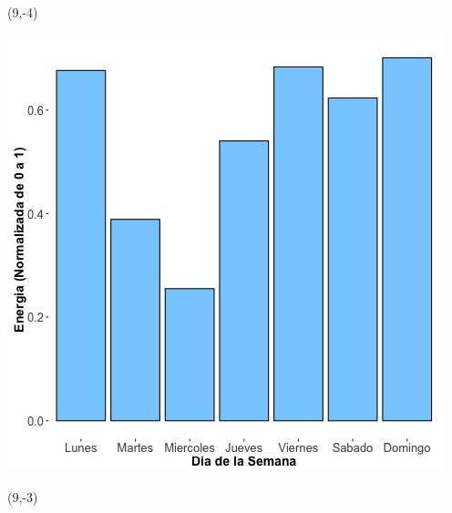 \documentclass{article}\usepackage[]{graphicx}\usepackage[]{color}
\newenvironment{knitrout}{}{} %
\begin{document}
 \begin{textblock}{1}(9,-4)
\begin{minipage}{20em}
\begingroup

\endgroup
\end{minipage}
\end{textblock}

\begin{knitrout}
\color{fgcolor}
\includegraphics[scale=0.65]{figure/A7_day_of_week_plot} 
\end{knitrout}

\begin{textblock}{1}(9,-3)
\begin{minipage}{20em}
\begingroup

\endgroup
\end{minipage}
\end{textblock}
\end{document}
